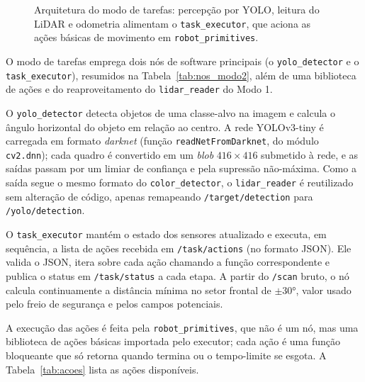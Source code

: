 \begin{figure}[H]
{
}
\caption{Arquitetura do modo de tarefas: percepção por YOLO, leitura do LiDAR e
odometria alimentam o \texttt{task\_executor}, que aciona as ações básicas de
movimento em \texttt{robot\_primitives}.}
\label{fig:pipeline_yolo}
\end{figure}

O modo de tarefas emprega dois nós de software principais (o \texttt{yolo\_detector}
e o \texttt{task\_executor}), resumidos na Tabela~\ref{tab:nos_modo2}, além de uma
biblioteca de ações e do reaproveitamento do \texttt{lidar\_reader} do Modo 1.

O \texttt{yolo\_detector} detecta objetos de uma classe-alvo na imagem e calcula o
ângulo horizontal do objeto em relação ao centro. A rede YOLOv3-tiny é carregada em
formato \textit{darknet} (função \texttt{readNetFromDarknet}, do módulo
\texttt{cv2.dnn}); cada quadro é convertido em um \textit{blob} $416 \times 416$
submetido à rede, e as saídas passam por um limiar de confiança e pela supressão
não-máxima. Como a saída segue o mesmo formato do \texttt{color\_detector}, o
\texttt{lidar\_reader} é reutilizado sem alteração de código, apenas remapeando
\texttt{/target/detection} para \texttt{/yolo/detection}.

O \texttt{task\_executor} mantém o estado dos sensores atualizado e executa, em
sequência, a lista de ações recebida em \texttt{/task/actions} (no formato JSON).
Ele valida o JSON, itera sobre cada ação chamando a função correspondente e publica
o status em \texttt{/task/status} a cada etapa. A partir do \texttt{/scan} bruto, o
nó calcula continuamente a distância mínima no setor frontal de $\pm 30°$, valor
usado pelo freio de segurança e pelos campos potenciais.

A execução das ações é feita pela \texttt{robot\_primitives}, que não é um nó, mas
uma biblioteca de ações básicas importada pelo executor; cada ação é uma função
bloqueante que só retorna quando termina ou o tempo-limite se esgota. A
Tabela~\ref{tab:acoes} lista as ações disponíveis.

